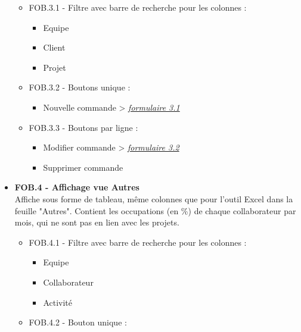 \documentclass[french]{report}
\begin{document}
\begin{itemize}[label=\textbullet, font=\normalfont \color{blue}]
\begin{itemize}[label=\textbullet]
    \item{FOB.3.1 - Filtre avec barre de recherche pour les colonnes :}

    \begin{itemize}[label=-]
      \item{Equipe}
      \item{Client}
      \item{Projet}
    \end{itemize}

    \item{FOB.3.2 - Boutons unique :}

    \begin{itemize}[label=-]
      \item{Nouvelle commande} > \hyperref[sec:3.1]{\emph{formulaire 3.1}}
    \end{itemize}

    \item{FOB.3.3 - Boutons par ligne :}

    \begin{itemize}[label=-]
      \item{Modifier commande} > \hyperref[sec:3.2]{\emph{formulaire 3.2}}
      \item{Supprimer commande}
    \end{itemize}

  \end{itemize}

  \item{\textbf{FOB.4 - Affichage vue Autres}}\\
Affiche sous forme de tableau, même colonnes que pour l’outil Excel dans la
feuille "Autres". Contient les occupations (en \%) de chaque collaborateur par
mois, qui ne sont pas en lien avec les projets.

\begin{itemize}[label=\textbullet]
  \item{FOB.4.1 - Filtre avec barre de recherche pour les colonnes :}

  \begin{itemize}[label=-]
    \item{Equipe}
    \item{Collaborateur}
    \item{Activité}
  \end{itemize}

  \item{FOB.4.2 - Bouton unique :}


\end{itemize}
\end{itemize}
\end{document}
